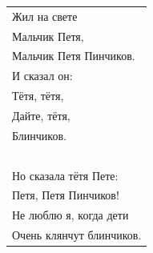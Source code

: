 \begin{tabular}{l}
Жил на свете \\
Мальчик Петя, \\
Мальчик Петя Пинчиков. \\
И сказал он: \\
Тётя, тётя, \\
Дайте, тётя, \\
Блинчиков. \\

~\\

Но сказала тётя Пете: \\
Петя, Петя Пинчиков! \\
Не люблю я, когда дети \\
Очень клянчут блинчиков. \\
\end{tabular}

\begin{flushright}
    \date{<1930"=е>}
\end{flushright}

